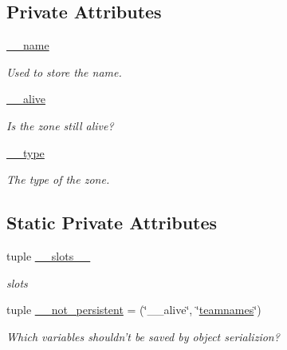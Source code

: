 \subsection*{Private Attributes}
\begin{DoxyCompactItemize}
\item 
\hyperlink{class_zone_1_1_zone_a72ab1886c15120f42281d35955ab21b5}{\_\-\_\-name}
\begin{DoxyCompactList}\small\item\em Used to store the name. \item\end{DoxyCompactList}\item 
\hyperlink{class_zone_1_1_zone_a1c4e31d1327ad4d7a2c31a2b7fcde5e7}{\_\-\_\-alive}
\begin{DoxyCompactList}\small\item\em Is the zone still alive? \item\end{DoxyCompactList}\item 
\hyperlink{class_zone_1_1_zone_a5164f57edacb2b3a7b3dfca3ba949139}{\_\-\_\-type}
\begin{DoxyCompactList}\small\item\em The type of the zone. \item\end{DoxyCompactList}\end{DoxyCompactItemize}
\subsection*{Static Private Attributes}
\begin{DoxyCompactItemize}
\item 
tuple \hyperlink{class_zone_1_1_zone_ad5bde96ea6dea6f68ee68d33a6c90850}{\_\-\_\-slots\_\-\_\-}
\begin{DoxyCompactList}\small\item\em slots \item\end{DoxyCompactList}\item 
tuple \hyperlink{class_zone_1_1_zone_a3e925f38205ecb6e4c2bab8c79182573}{\_\-\_\-not\_\-persistent} = (\char`\"{}\_\-\_\-alive\char`\"{}, \char`\"{}\hyperlink{class_zone_1_1_zone_a0f3f8429ae8a37672f700da3f2805a91}{teamnames}\char`\"{})
\begin{DoxyCompactList}\small\item\em Which variables shouldn't be saved by object serializion? \item\end{DoxyCompactList}\end{DoxyCompactItemize}


